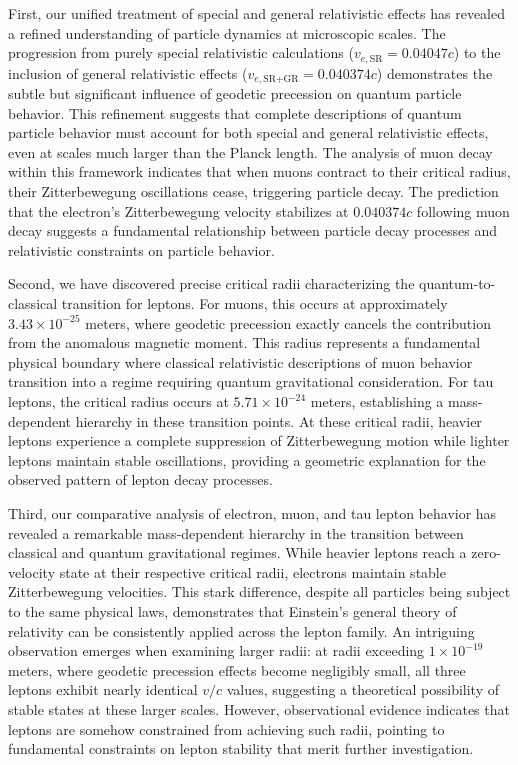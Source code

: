 \documentclass[%
 reprint,
 amsmath,amssymb,
 aps,
]{revtex4-1}
\numberwithin{equation}{section}%
\begin{document}
First, our unified treatment of special and general relativistic effects has revealed a refined understanding of particle dynamics at microscopic scales. The progression from purely special relativistic calculations ($v_{e,\text{SR}} = 0.04047c$) to the inclusion of general relativistic effects ($v_{e,\text{SR+GR}} = 0.040374c$) demonstrates the subtle but significant influence of geodetic precession on quantum particle behavior. This refinement suggests that complete descriptions of quantum particle behavior must account for both special and general relativistic effects, even at scales much larger than the Planck length. The analysis of muon decay within this framework indicates that when muons contract to their critical radius, their Zitterbewegung oscillations cease, triggering particle decay. The prediction that the electron's Zitterbewegung velocity stabilizes at $0.040374c$ following muon decay suggests a fundamental relationship between particle decay processes and relativistic constraints on particle behavior.

Second, we have discovered precise critical radii characterizing the quantum-to-classical transition for leptons. For muons, this occurs at approximately $3.43 \times 10^{-25}$ meters, where geodetic precession exactly cancels the contribution from the anomalous magnetic moment. This radius represents a fundamental physical boundary where classical relativistic descriptions of muon behavior transition into a regime requiring quantum gravitational consideration. For tau leptons, the critical radius occurs at $5.71 \times 10^{-24}$ meters, establishing a mass-dependent hierarchy in these transition points. At these critical radii, heavier leptons experience a complete suppression of Zitterbewegung motion while lighter leptons maintain stable oscillations, providing a geometric explanation for the observed pattern of lepton decay processes.

Third, our comparative analysis of electron, muon, and tau lepton behavior has revealed a remarkable mass-dependent hierarchy in the transition between classical and quantum gravitational regimes. While heavier leptons reach a zero-velocity state at their respective critical radii, electrons maintain stable Zitterbewegung velocities. This stark difference, despite all particles being subject to the same physical laws, demonstrates that Einstein's general theory of relativity can be consistently applied across the lepton family. An intriguing observation emerges when examining larger radii: at radii exceeding $1 \times 10^{-19}$ meters, where geodetic precession effects become negligibly small, all three leptons exhibit nearly identical $v/c$ values, suggesting a theoretical possibility of stable states at these larger scales. However, observational evidence indicates that leptons are somehow constrained from achieving such radii, pointing to fundamental constraints on lepton stability that merit further investigation.
\end{document}
